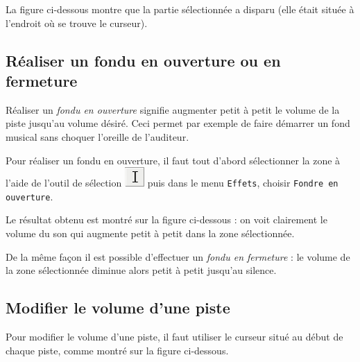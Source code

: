 
La figure ci-dessous montre que la partie sélectionnée a disparu (elle était située à l'endroit où se trouve le curseur).






\subsection{Réaliser un fondu en ouverture ou en fermeture}\label{Son1fondu}

Réaliser un \emph{fondu en ouverture} signifie augmenter petit à petit le volume de la piste jusqu'au volume désiré. Ceci permet par exemple de faire démarrer un fond musical sans choquer l'oreille de l'auditeur.

Pour réaliser un fondu en ouverture, il faut tout d'abord sélectionner la zone à l'aide de l'outil de sélection  \includegraphics[width=.5cm]{./images/son01/audacityIconeSelection} puis dans le menu \texttt{Effets}, choisir \texttt{Fondre en ouverture}.  


Le résultat obtenu est montré sur la figure ci-dessous : on voit clairement le volume du son qui augmente petit à petit dans la zone sélectionnée.


De la même façon il est possible d'effectuer un \emph{fondu en fermeture} : le volume de la zone sélectionnée diminue alors petit à petit jusqu'au silence. 


\subsection{Modifier le volume d'une piste}\label{Son1volume}

Pour modifier le volume d'une piste, il faut utiliser le curseur situé au début de chaque piste, comme montré sur la figure ci-dessous.


